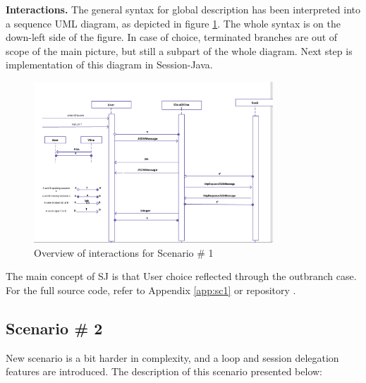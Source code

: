 \textbf{Interactions. } The general syntax for global description has been interpreted into a sequence UML diagram, as depicted in figure \ref{fig:interaction-overview-sc1}. The whole syntax is on the down-left side of the figure. In case of choice, terminated branches are out of scope of the main picture, but still a subpart of the whole diagram. Next step is implementation of this diagram in Session-Java.

\begin{figure}
\centering
\includegraphics[width=0.8\textwidth]{resources/interaction-sc1.png}
\caption{Overview of interactions for Scenario \# 1}
\label{fig:interaction-overview-sc1}
\end{figure}

The main concept of SJ is that User choice reflected through the outbranch case. For the full source code, refer to Appendix \ref{app:sc1} or repository \cite{thesis}.

\subsection{Scenario \# 2}

New scenario is a bit harder in complexity, and a loop and session delegation features are introduced. The description of this scenario presented below:

